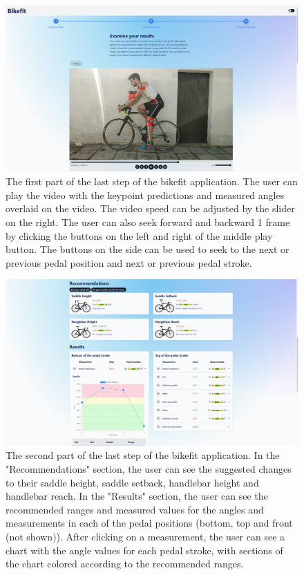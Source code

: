 \begin{figure}[htbp]
    \centering
    \includegraphics[width=\textwidth]{obrazky-figures/step3-top.png}
    \caption{The first part of the last step of the bikefit application. The user can play the video with the keypoint predictions and measured angles overlaid on the video. The video speed can be adjusted by the slider on the right. The user can also seek forward and backward 1 frame by clicking the buttons on the left and right of the middle play button. The buttons on the side can be used to seek to the next or previous pedal position and next or previous pedal stroke.}
    \label{fig:step3-top}
\end{figure}

\begin{figure}[htbp]
    \centering
    \includegraphics[width=\textwidth]{obrazky-figures/step3-bot.png}
    \caption{The second part of the last step of the bikefit application. In the "Recommendations" section, the user can see the suggested changes to their saddle height, saddle setback, handlebar height and handlebar reach. In the "Results" section, the user can see the recommended ranges and measured values for the angles and measurements in each of the pedal positions (bottom, top and front (not shown)). After clicking on a measurement, the user can see a chart with the angle values for each pedal stroke, with sections of the chart colored according to the recommended ranges.}
    \label{fig:step3-bottom}
\end{figure}





